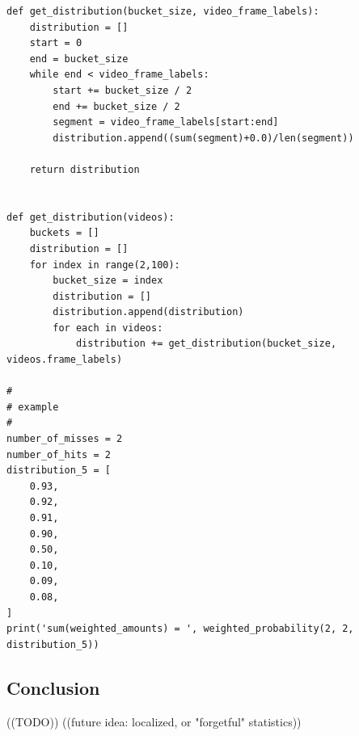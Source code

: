 \documentclass{article}
\newcommand{\br}{ \hfill \break}
\begin{document}
\begin{adjustwidth}{2.5em}{0pt}
\begin{verbatim}
def get_distribution(bucket_size, video_frame_labels):
    distribution = []
    start = 0
    end = bucket_size
    while end < video_frame_labels:
        start += bucket_size / 2
        end += bucket_size / 2
        segment = video_frame_labels[start:end]
        distribution.append((sum(segment)+0.0)/len(segment))
    
    return distribution


def get_distribution(videos):
    buckets = []
    distribution = []
    for index in range(2,100):
        bucket_size = index
        distribution = []
        distribution.append(distribution)
        for each in videos:
            distribution += get_distribution(bucket_size, videos.frame_labels)
    
# 
# example
# 
number_of_misses = 2
number_of_hits = 2
distribution_5 = [
    0.93,
    0.92,
    0.91,
    0.90,
    0.50,
    0.10,
    0.09,
    0.08,
]
print('sum(weighted_amounts) = ', weighted_probability(2, 2, distribution_5))
        \end{verbatim}
    
    \subsection{Conclusion}
        ((TODO))
        ((future idea: localized, or "forgetful" statistics))
        

%
%
\end{adjustwidth} \br
%
\end{document}
